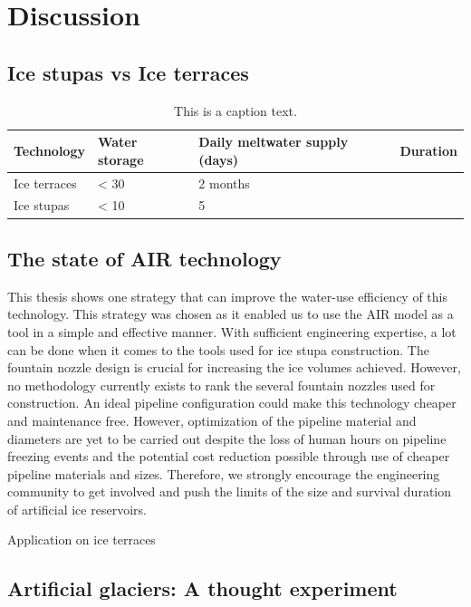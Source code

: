 \section{Discussion}

\subsection{Ice stupas vs Ice terraces}

\begin{table}[htb]
	\begin{tabularx}{\textwidth}{X | X | X | X}
		\hline
    \textbf{Technology}& \textbf{Water storage}& \textbf{Daily meltwater supply (days)}& \textbf{Duration} \\
    \hline
		Ice terraces			& < 30				     & 2 months				\\
    Ice stupas        & < 10             & 5				\\
		\hline
	\end{tabularx}
	\label{tab:table1}
	\caption{This is a caption text.}
\end{table}


\subsection{The state of AIR technology}

This thesis shows one strategy that can improve the water-use efficiency of this technology. This strategy was
chosen as it enabled us to use the AIR model as a tool in a simple and effective manner. With sufficient
engineering expertise, a lot can be done when it comes to the tools used for ice stupa construction. The
fountain nozzle design is crucial for increasing the ice volumes achieved. However, no methodology currently
exists to rank the several fountain nozzles used for construction. An ideal pipeline configuration could make
this technology cheaper and maintenance free. However, optimization of the pipeline material and diameters are
yet to be carried out despite the loss of human hours on pipeline freezing events and the potential cost
reduction possible through use of cheaper pipeline materials and sizes. Therefore, we strongly encourage the
engineering community to get involved and push the limits of the size and survival duration of artificial ice
reservoirs. 

Application on ice terraces

\subsection{Artificial glaciers: A thought experiment}

